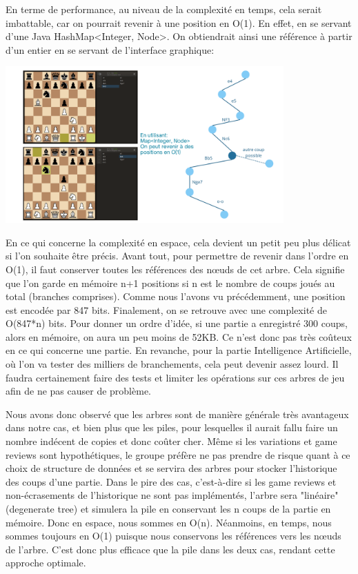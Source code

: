 \documentclass{article}
\begin{document}
En terme de performance, au niveau de la complexité en temps, cela serait imbattable, car on pourrait revenir à une position en O(1). En effet,
en se servant d'une Java HashMap\textless Integer, Node\textgreater. On obtiendrait ainsi une référence à partir d'un entier en se servant de
l'interface graphique:\\
\begin{center}
    \includegraphics[height=6.0cm]{arbres-reprise-coups.png}
\end{center}


En ce qui concerne la complexité en espace, cela devient un petit peu plus délicat si l'on souhaite être précis. Avant tout, pour permettre de
revenir dans l'ordre en O(1), il faut conserver toutes les références des nœuds de cet arbre. Cela signifie que l'on garde en mémoire n+1 positions 
si n est le nombre de coups joués au total (branches comprises). Comme nous l'avons vu précédemment, une position est encodée par 847 bits.
Finalement, on se retrouve avec une complexité de O(847*n) bits. Pour donner un ordre d'idée, si une partie a enregistré 300 coups, alors en mémoire,
on aura un peu moins de 52KB. Ce n'est donc pas très coûteux en ce qui concerne une partie. En revanche, pour la partie Intelligence Artificielle,
où l'on va tester des milliers de branchements, cela peut devenir assez lourd. Il faudra certainement faire des tests et limiter les opérations
sur ces arbres de jeu afin de ne pas causer de problème.

\par Nous avons donc observé que les arbres sont de manière générale très avantageux dans notre cas, et bien plus que les piles, pour lesquelles
il aurait fallu faire un nombre indécent de copies et donc coûter cher. Même si les variations et game reviews sont hypothétiques, le groupe préfère
ne pas prendre de risque quant à ce choix de structure de données et se servira des arbres pour stocker l'historique des coups d'une partie.
Dans le pire des cas, c'est-à-dire si les game reviews et non-écrasements de l'historique ne sont pas implémentés, l'arbre sera "linéaire"
(degenerate tree) et simulera la pile en conservant les n coups de la partie en mémoire. Donc en espace, nous sommes en O(n).
Néanmoins, en temps, nous sommes toujours en O(1) puisque nous conservons les références vers les nœuds de l'arbre. C'est donc plus efficace que
la pile dans les deux cas, rendant cette approche optimale.
\end{document}
